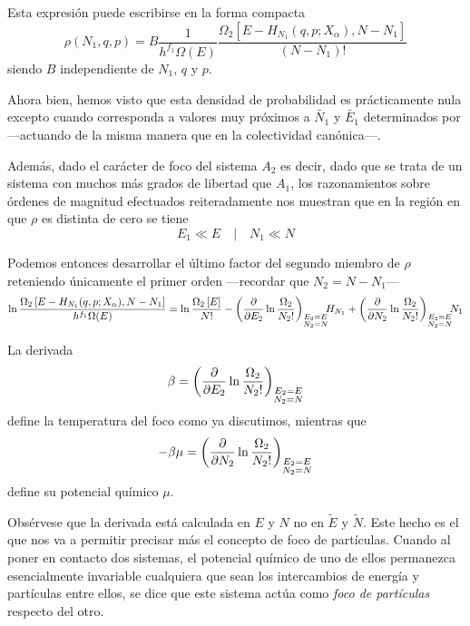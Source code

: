 Esta expresión puede escribirse en la forma compacta
\begin{equation}
\rho(N_1,q,p) = B\frac{1}{h^{f_1} \Omega(E)} \frac{\Omega_2 \left[ E - H_{N_1}(q,p;X_\alpha), N-N_1 \right]}{(N-N_1)!}
\end{equation}
siendo $B$ independiente de $N_1$, $q$ y $p$.

Ahora bien, hemos visto que esta densidad de probabilidad es prácticamente nula excepto cuando corresponda a valores muy próximos a $\widetilde{N_1}$ y $\widetilde{E_1}$ determinados por ---actuando de la misma manera que en la colectividad canónica---.

Además, dado el carácter de foco del sistema $A_2$ es decir, dado que se trata de un sistema con muchos más grados de libertad que $A_1$, los razonamientos sobre órdenes de magnitud efectuados reiteradamente nos muestran que en la región en que $\rho$ es distinta de cero se tiene
$$E_1 \ll E \quad | \quad N_1 \ll N$$

Podemos entonces desarrollar el último factor del segundo miembro de $\rho$ reteniendo únicamente el primer orden ---recordar que $N_2 = N - N_1$---
$$\ln \frac{\Omega_2 \left[ E - H_{N_1}(q,p;X_\alpha), N-N_1 \right]}{h^{f_1} \Omega(E)} = \ln \frac{\Omega_2 \left[ E \right] }{N!} - \left( \pdv{E_2} \ln\frac{\Omega_2}{N_2!}\right)_{\substack{E_2 = E \\ N_2 = N}} \mkern-8mu H_{N_1} + \left( \pdv{N_2} \ln\frac{\Omega_2}{N_2!}\right)_{\substack{E_2 = E \\ N_2 = N}} \mkern-8mu N_1$$

La derivada
\begin{equation}
	\beta = \left( \pdv{E_2} \ln\frac{\Omega_2}{N_2!}\right)_{\substack{E_2 = E \\ N_2 = N}}
\end{equation}
define la temperatura del foco como ya discutimos, mientras que
\begin{equation}
-\beta \mu = \left( \pdv{N_2} \ln\frac{\Omega_2}{N_2!}\right)_{\substack{E_2 = E \\ N_2 = N}}
\end{equation}
define su potencial químico $\mu$.

Obsérvese que la derivada está calculada en $E$ y $N$ no en $\widetilde{E}$ y $\widetilde{N}$. Este hecho es el que nos va a permitir precisar más el concepto de foco de partículas.
Cuando al poner en contacto dos sistemas, el potencial químico de uno de ellos permanezca esencialmente invariable cualquiera que sean los intercambios de energía y partículas entre ellos, se dice que este sistema actúa como \emph{foco de partículas} respecto del otro.

